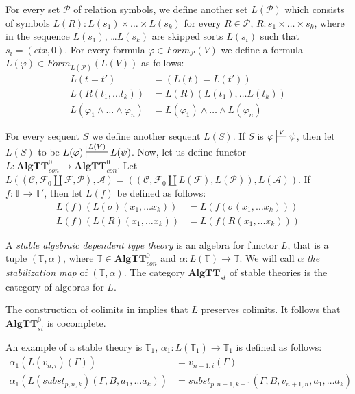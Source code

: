 \documentclass{elsarticle}
\theoremstyle{definition}
\theoremstyle{remark}
\newcommand{\cat}[1]{\mathbf{#1}}
\newcommand{\algtt}{\cat{AlgTT}}
\numberwithin{figure}{section}
\begin{document}
For every set $\mathcal{P}$ of relation symbols, we define another set $L(\mathcal{P})$ which consists of symbols
    $L(R) : L(s_1) \times \ldots \times L(s_k)$ for every $R \in \mathcal{P}$, $R : s_1 \times \ldots \times s_k$,
    where in the sequence $L(s_1)$, \ldots $L(s_k)$ are skipped sorts $L(s_i)$ such that $s_i = (ctx,0)$.
For every formula $\varphi \in Form_\mathcal{P}(V)$ we define a formula $L(\varphi) \in Form_{L(\mathcal{P})}(L(V))$ as follows:
\begin{align*}
L(t = t') & = (L(t) = L(t')) \\
L(R(t_1, \ldots t_k)) & = L(R)(L(t_1), \ldots L(t_k)) \\
L(\varphi_1 \land \ldots \land \varphi_n) & = L(\varphi_1) \land \ldots \land L(\varphi_n)
\end{align*}

For every sequent $S$ we define another sequent $L(S)$.
If $S$ is $\varphi \sststile{}{V} \psi$, then let $L(S)$ to be $L(\varphi) \sststile{}{L(V)} L(\psi)$.
Now, let us define functor $L : \algtt^0_{con} \to \algtt^0_{con}$.
Let $L((\mathcal{C}, \mathcal{F}_0 \amalg \mathcal{F}, \mathcal{P}), \mathcal{A}) = ((\mathcal{C}, \mathcal{F}_0 \amalg L(\mathcal{F}), L(\mathcal{P})), L(\mathcal{A}))$.
If $f : \mathbb{T} \to \mathbb{T}'$, then let $L(f)$ be defined as follows:
\begin{align*}
L(f)(L(\sigma)(x_1, \ldots x_k)) & = L(f(\sigma(x_1, \ldots x_k))) \\
L(f)(L(R)(x_1, \ldots x_k)) & = L(f(R(x_1, \ldots x_k)))
\end{align*}

\begin{defn}
A \emph{stable algebraic dependent type theory} is an algebra for functor $L$,
    that is a tuple $(\mathbb{T},\alpha)$, where $\mathbb{T} \in \algtt^0_{con}$ and $\alpha : L(\mathbb{T}) \to \mathbb{T}$.
We will call $\alpha$ \emph{the stabilization map} of $(\mathbb{T},\alpha)$.
The category $\algtt^0_{st}$ of stable theories is the category of algebras for $L$.
\end{defn}

The construction of colimits in  implies that $L$ preserves colimits.
It follows that $\algtt^0_{st}$ is cocomplete.

An example of a stable theory is $\mathbb{T}_1$, $\alpha_1 : L(\mathbb{T}_1) \to \mathbb{T}_1$ is defined as follows:
\begin{align*}
\alpha_1(L(v_{n,i})(\Gamma)) & = v_{n+1,i}(\Gamma) \\
\alpha_1(L(subst_{p,n,k})(\Gamma, B, a_1, \ldots a_k)) & = subst_{p,n+1,k+1}(\Gamma, B, v_{n+1,n}, a_1, \ldots a_k)
\end{align*}
\end{document}
